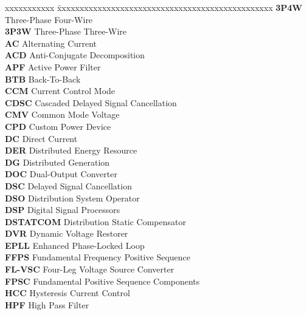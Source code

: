 \abbreviations
%
\noindent
\begin{tabbing}
xxxxxxxxxxx \= xxxxxxxxxxxxxxxxxxxxxxxxxxxxxxxxxxxxxxxxxxxxxxxx \kill
\textbf{3P4W}  \> 	Three-Phase Four-Wire					\\
\textbf{3P3W}  \> 	Three-Phase Three-Wire					\\

\textbf{AC}   \> Alternating Current 					\\
\textbf{ACD}  \> Anti-Conjugate Decomposition						\\
\textbf{APF}  \> Active Power Filter						\\

\textbf{BTB}   \>  Back-To-Back						\\

\textbf{CCM}  \> Current Control Mode						\\
\textbf{CDSC}  \> Cascaded Delayed Signal Cancellation						\\
\textbf{CMV}  \> Common Mode Voltage						\\
\textbf{CPD}  \> Custom Power Device						\\

\textbf{DC}   \> Direct Current		  					\\
\textbf{DER}  \> Distributed Energy Resource						\\
\textbf{DG}  \> Distributed Generation						\\
\textbf{DOC}  \> 	Dual-Output Converter					\\
\textbf{DSC}  \> Delayed Signal Cancellation						\\
\textbf{DSO}  \> Distribution System Operator						\\
\textbf{DSP}  \>  Digital Signal Processors						\\
\textbf{DSTATCOM}  \> Distribution Static Compensator						\\
\textbf{DVR}  \> Dynamic Voltage Restorer						\\

\textbf{EPLL}  \> Enhanced Phase-Locked Loop						\\

\textbf{FFPS}  \>  Fundamental Frequency Positive Sequence						\\
\textbf{FL-VSC}  \> Four-Leg Voltage Source Converter						\\
\textbf{FPSC}  \> Fundamental Positive Sequence Components						\\

\textbf{HCC}  \> Hysteresis Current Control						\\
\textbf{HPF}  \> High Pass Filter						\\


\end{tabbing}
